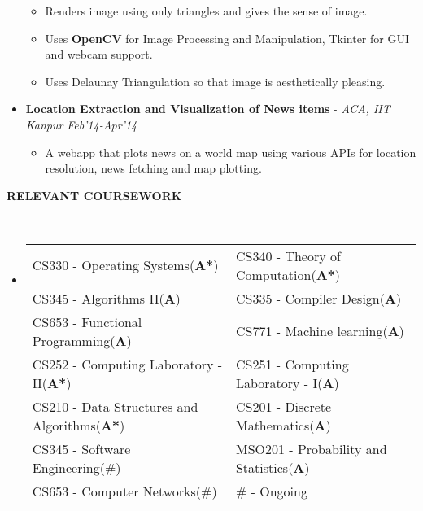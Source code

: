 \documentclass[a4paper,9pt]{extarticle}
\newcommand{\lsep}{-0.5cm}
\newcommand{\resheading}[1]{{\small \colorbox{mygrey}{\begin{minipage}{0.975\textwidth}{\textbf{#1 \vphantom{p\^{E}}}}\end{minipage}}}}
\begin{document}
\begin{itemize}
          \vspace{-2mm}\begin{itemize}  \itemsep -2pt
          \item Renders image using only triangles and gives the sense of image.
          \item Uses \textbf{OpenCV} for Image Processing and Manipulation, Tkinter for GUI and webcam support.
          \item Uses Delaunay Triangulation so that image is aesthetically pleasing.
          \end{itemize}
        \item
          \textbf{Location Extraction and Visualization of News items} - \textit{ ACA, IIT Kanpur }
          \hfill  \textit{Feb'14-Apr'14}
          \vspace{-2mm}\begin{itemize} \itemsep -2pt
          \item A webapp that plots news on a world map  using various APIs for location resolution, news fetching and map plotting.
          \end{itemize}
        \end{itemize}

        \resheading{\textbf{RELEVANT COURSEWORK} }\\[\lsep] \vspace{2mm}
        \begin{itemize}
        \item[]
          \begin{tabular}{p{69mm}@{\hskip 0.25in} p{80mm}} 
            CS330 - Operating Systems(\textbf{A*}) & CS340 - Theory of Computation(\textbf{A*})  \\
            CS345 - Algorithms II(\textbf{A}) & CS335 - Compiler Design(\textbf{A})  \\
            CS653 - Functional Programming(\textbf{A}) & CS771 - Machine learning(\textbf{A})  \\
            CS252 - Computing Laboratory - II(\textbf{A*}) & CS251 - Computing Laboratory - I(\textbf{A})  \\
            CS210 - Data Structures and Algorithms(\textbf{A*}) & CS201 - Discrete Mathematics(\textbf{A})  \\
            CS345 - Software Engineering(\#)             & MSO201 - Probability and Statistics(\textbf{A}) \\
            CS653 - Computer Networks(\#)  & \hfill \# - Ongoing
          \end{tabular}

        \end{itemize}
\end{document}
